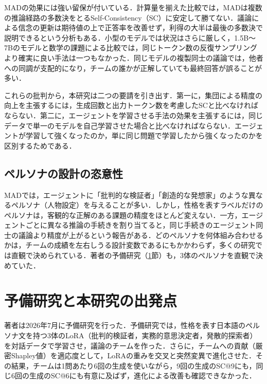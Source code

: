 MADの効果には強い留保が付いている．計算量を揃えた比較では，MADは複数の推論経路の多数決をとるSelf-Consistency（SC）\cite{wang2023selfconsistency}に安定して勝てない\cite{smit2024should,zhang2025debate}．議論による信念の更新は期待値の上で正答率を改善せず，利得の大半は最後の多数決で説明できるという分析もある\cite{choi2025debate}．小型のモデルでは状況はさらに厳しく，1.5B〜7Bのモデルと数学の課題による比較では，同じトークン数の反復サンプリングより確実に良い手法は一つもなかった\cite{mirzaei2026samplemore}．同じモデルの複製同士の議論では，他者への同調が支配的になり，チームの誰かが正解していても最終回答が誤ることが多い\cite{cost2026consensus}．

これらの批判から，本研究は二つの要請を引き出す．第一に，集団による精度の向上を主張するには，生成回数と出力トークン数を考慮したSCと比べなければならない．第二に，エージェントを学習させる手法の効果を主張するには，同じデータで単一のモデルを自己学習させた場合と比べなければならない．エージェントが学習して強くなったのか，単に同じ問題で学習したから強くなったのかを区別するためである．

\subsection{ペルソナの設計の恣意性}
\label{sec:1.1.3}

MADでは，エージェントに「批判的な検証者」「創造的な発想家」のような異なるペルソナ（人物設定）を与えることが多い．しかし，性格を表すラベルだけのペルソナは，客観的な正解のある課題の精度をほとんど変えない\cite{zheng2024persona,kim2024persona}．一方，エージェントごとに異なる推論の手続きを割り当てると，同じ手続きのエージェント同士の議論より精度が上がるという報告がある\cite{liu2025dmad}．どのペルソナを何体組み合わせるかは，チームの成績を左右しうる設計変数であるにもかかわらず，多くの研究では直観で決められている．著者の予備研究（\ref{sec:1.2}節）も，3体のペルソナを直観で決めていた．

\section{予備研究と本研究の出発点}
\label{sec:1.2}

著者は2026年7月に予備研究を行った．予備研究では，性格を表す日本語のペルソナ文を持つ3体のLoRA（批判的検証者，実務的意思決定者，発散的探索者）を対話データで学習させ，議論のチームを作った．さらに，チームへの貢献（厳密Shapley値）を適応度として，LoRAの重みを交叉と突然変異で進化させた．その結果，チームは1問あたり6回の生成を使いながら，9回の生成のSC@9にも，同じ6回の生成のSC@6にも有意に及ばず，進化による改善も確認できなかった．

